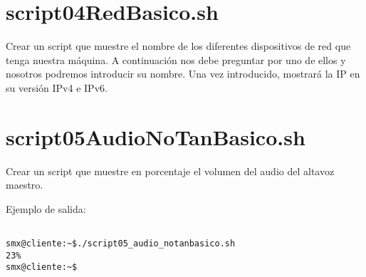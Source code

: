 \documentclass[11pt]{article}
\begin{document}
\section{script04RedBasico.sh}
\label{sec:orgbc6c00e}

Crear un script que muestre el nombre de los diferentes dispositivos de red
que tenga nuestra máquina. A continuación nos debe preguntar por uno de ellos
y nosotros podremos introducir su nombre. Una vez introducido, mostrará la IP
en su versión IPv4 e IPv6.

\section{script05AudioNoTanBasico.sh}
\label{sec:orgd34817e}

Crear un script que muestre en porcentaje el volumen del audio del altavoz
maestro.

Ejemplo de salida:

\begin{verbatim}

smx@cliente:~$./script05_audio_notanbasico.sh
23%
smx@cliente:~$

\end{verbatim}
\end{document}
